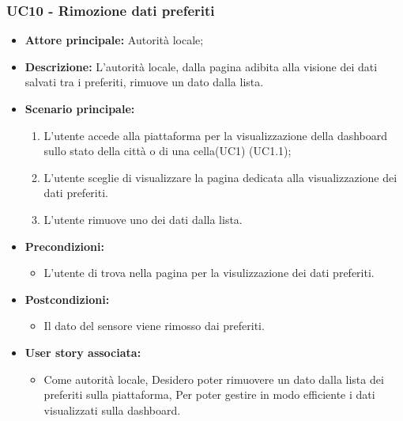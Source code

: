 \subsubsection{UC10 - Rimozione dati preferiti}
\begin{itemize}
    \item \textbf{Attore principale:} Autorità locale;
    \item \textbf{Descrizione:} L’autorità locale, dalla pagina adibita alla visione dei dati salvati tra i preferiti, rimuove un dato dalla lista.
    \item \textbf{Scenario principale:}
          \begin{enumerate}
              \item L'utente accede alla piattaforma per la visualizzazione della dashboard sullo stato della città o di una cella(UC1) (UC1.1);
              \item L'utente sceglie di visualizzare la pagina dedicata alla visualizzazione dei dati preferiti.
              \item L'utente rimuove uno dei dati dalla lista.
          \end{enumerate}
    \item \textbf{Precondizioni:}
          \begin{itemize}
              \item  L'utente di trova nella pagina per la visulizzazione dei dati preferiti.
          \end{itemize}
    \item \textbf{Postcondizioni:}
          \begin{itemize}
              \item  Il dato del sensore viene rimosso dai preferiti.
          \end{itemize}
    \item \textbf{User story associata:}
          \begin{itemize}
              \item Come autorità locale,
                    Desidero poter rimuovere un dato dalla lista dei preferiti sulla piattaforma,
                    Per poter gestire in modo efficiente i dati visualizzati sulla dashboard.
          \end{itemize}
\end{itemize}